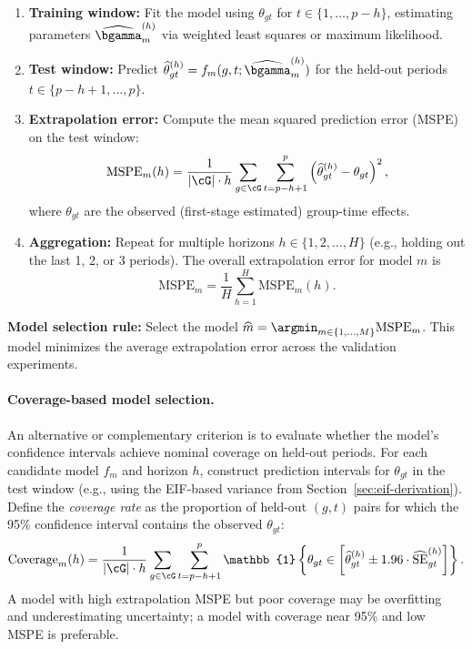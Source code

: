 \documentclass{article}
\begin{document}
\begin{enumerate}
    \item \textbf{Training window:} Fit the model using $\theta_{gt}$ for $t \in \{1, \ldots, p - h\}$, estimating parameters $\widehat{\bgamma}_m^{(h)}$ via weighted least squares or maximum likelihood.
    \item \textbf{Test window:} Predict $\widehat{\theta}_{gt}^{(h)} = f_m(g, t; \widehat{\bgamma}_m^{(h)})$ for the held-out periods $t \in \{p - h + 1, \ldots, p\}$.
    \item \textbf{Extrapolation error:} Compute the mean squared prediction error (MSPE) on the test window:
    \[
    \text{MSPE}_m(h) = \frac{1}{|\cG| \cdot h} \sum_{g \in \cG} \sum_{t = p-h+1}^{p} \left( \widehat{\theta}_{gt}^{(h)} - \theta_{gt} \right)^2,
    \]
    where $\theta_{gt}$ are the observed (first-stage estimated) group-time effects.
    \item \textbf{Aggregation:} Repeat for multiple horizons $h \in \{1, 2, \ldots, H\}$ (e.g., holding out the last 1, 2, or 3 periods). The overall extrapolation error for model $m$ is
    \[
    \text{MSPE}_m = \frac{1}{H} \sum_{h=1}^H \text{MSPE}_m(h).
    \]
\end{enumerate}

\textbf{Model selection rule:} Select the model $\widehat{m} = \argmin_{m \in \{1,\ldots,M\}} \text{MSPE}_m$. This model minimizes the average extrapolation error across the validation experiments.

\paragraph{Coverage-based model selection.}
An alternative or complementary criterion is to evaluate whether the model's confidence intervals achieve nominal coverage on held-out periods. For each candidate model $f_m$ and horizon $h$, construct prediction intervals for $\theta_{gt}$ in the test window (e.g., using the EIF-based variance from Section~\ref{sec:eif-derivation}). Define the \emph{coverage rate} as the proportion of held-out $(g,t)$ pairs for which the 95\% confidence interval contains the observed $\theta_{gt}$:
\[
\text{Coverage}_m(h) = \frac{1}{|\cG| \cdot h} \sum_{g \in \cG} \sum_{t = p-h+1}^{p} \mathbb{1}\left\{ \theta_{gt} \in \left[\widehat{\theta}_{gt}^{(h)} \pm 1.96 \cdot \widehat{\text{SE}}_{gt}^{(h)} \right] \right\}.
\]
A model with high extrapolation MSPE but poor coverage may be overfitting and underestimating uncertainty; a model with coverage near 95\% and low MSPE is preferable.
\end{document}
